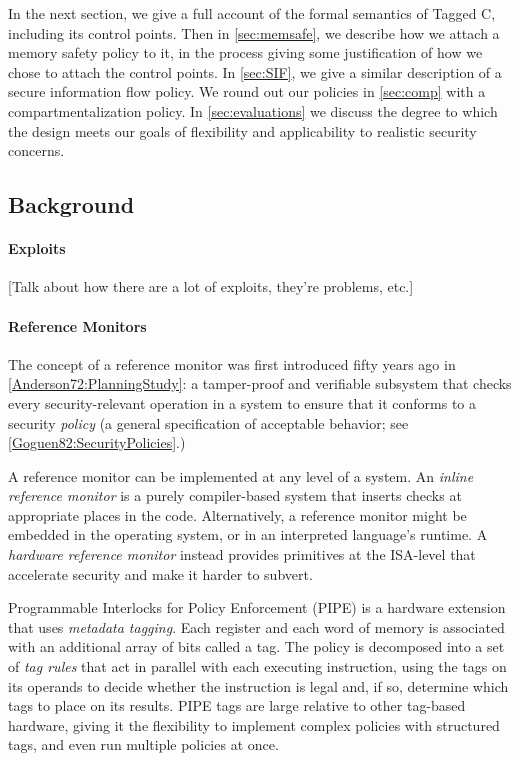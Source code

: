 \documentclass[acmsmall,review,anonymous]{acmart}\settopmatter{printfolios=true,printccs=false,printacmref=false}
\begin{document}
In the next section, we give a full account of the formal semantics of Tagged C,
including its control points. Then in \cref{sec:memsafe}, we describe how we attach
a memory safety policy to it, in the process giving some justification of how we chose to
attach the control points. In \cref{sec:SIF}, we give a similar description of
a secure information flow policy. We round out our policies in \cref{sec:comp} with
a compartmentalization policy. In \cref{sec:evaluations} we discuss the degree to
which the design meets our goals of flexibility and applicability to realistic
security concerns.

\subsection{Background}

\paragraph{Exploits}

[Talk about how there are a lot of exploits, they're problems, etc.]

\paragraph{Reference Monitors}

The concept of a reference monitor was first introduced fifty years ago in \cref{Anderson72:PlanningStudy}:
a tamper-proof and verifiable subsystem that checks every security-relevant operation in a system to
ensure that it conforms to a security {\em policy} (a general specification of acceptable behavior;
see \cref{Goguen82:SecurityPolicies}.)

A reference monitor can be implemented at any level of a system. An {\em inline reference monitor}
is a purely compiler-based system that inserts checks at appropriate places in the code.
Alternatively, a reference monitor might be embedded in the operating system, or in an interpreted
language's runtime. A {\em hardware reference monitor} instead provides primitives at the ISA-level
that accelerate security and make it harder to subvert.

Programmable Interlocks for Policy Enforcement (PIPE) \cite{Dhawan14:PUMP} is a hardware extension
that uses {\em metadata tagging}. Each register and each word of memory is associated with
an additional array of bits called a tag. The policy is decomposed into a set of {\em tag rules}
that act in parallel with each executing instruction, using the tags on its operands to
decide whether the instruction is legal and, if so, determine which tags to place on its results.
PIPE tags are large relative to other tag-based hardware, giving it the flexibility
to implement complex policies with structured tags, and even run multiple policies at once.
\end{document}
